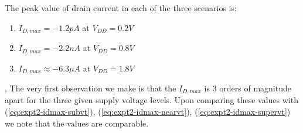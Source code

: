 \documentclass[12pt,a4paper]{article}
\begin{document}
\noindent The peak value of drain current in each of the three scenarios is:

\begin{enumerate}
    \item $I_{D,max} = -1.2 pA$ at $V_{DD} = 0.2 V$
    \item $I_{D,max} = -2.2 nA$ at $V_{DD} = 0.8 V$
    \item $I_{D,max} \approx -6.3 \mu A$ at $V_{DD} = 1.8 V$
\end{enumerate}

\noindent, The very first observation we make is that the $I_{D,max}$ is 3 orders of magnitude apart for the three given supply voltage levels. Upon comparing these values with (\ref{eq:expt2-idmax-subvt}), (\ref{eq:expt2-idmax-nearvt}), (\ref{eq:expt2-idmax-supervt}) we note that the values are comparable.
\end{document}
